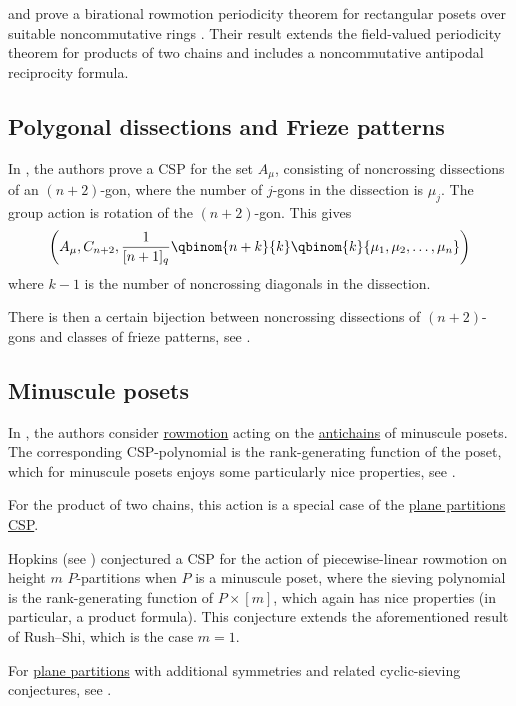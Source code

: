  and  prove a birational rowmotion
periodicity theorem for rectangular posets over suitable noncommutative rings
\cite{GrinbergRoby2023}.  Their result extends the field-valued periodicity
theorem for products of two chains and includes a noncommutative antipodal
reciprocity formula.


\subsection[cspListFrieze]{Polygonal dissections and Frieze patterns}

In \cite{AdamsBanian2025x}, the authors prove a CSP for the set $A_\mu$,
consisting of noncrossing dissections of an $(n+2)$-gon, where the number of
$j$-gons in the dissection is $\mu_j$.  The group action is rotation of the
$(n+2)$-gon.  This gives
\[
\left( A_\mu, C_{n+2},  \frac{1}{[n+1]_q} \qbinom{n+k}{k}\qbinom{k}{\mu_1,\mu_2,\dotsc,\mu_n} \right)
\]
where $k-1$ is the number of noncrossing diagonals in the dissection.

There is then a certain bijection between noncrossing dissections of
$(n+2)$-gons and classes of frieze patterns, see \cite{HolmJorgensen2018}.



\subsection[cspListPosetsMinuscule]{Minuscule posets}



In \cite{RushShi2012}, the authors consider \hyperref[rowmotion]{rowmotion}
acting on the \hyperref[antichain]{antichains} of minuscule posets.
The corresponding CSP-polynomial is the rank-generating function of the poset,
which for minuscule posets enjoys some particularly nice properties, see
\cite[Ex.~170]{StanleyEC1}.

For the product of two chains, this action is a special case of the
\hyperref[cspPlanePartitions]{plane partitions CSP}.

Hopkins (see \cite{Hopkins2024}) conjectured a CSP for the action of piecewise-linear
rowmotion on height $m$ $P$-partitions when $P$ is a minuscule poset, where the
sieving polynomial is the rank-generating function of $P\times[m]$,
which again has nice properties (in particular, a product formula).
This conjecture extends the aforementioned result of Rush--Shi, which is the case $m=1$.

For \hyperref[planePartitions]{plane partitions} with additional symmetries
and related cyclic-sieving conjectures, see \cite{Hopkins2020}.



